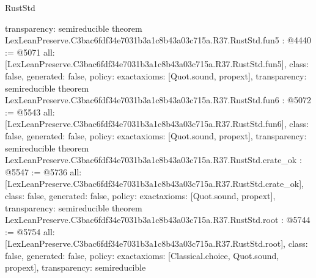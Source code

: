 \begin{lexlean}{RustStd}
\begin{coremodule}
{  transparency: semireducible
}
theorem LexLeanPreserve.C3bac6fdf34e7031b3a1c8b43a03c715a.R37.RustStd.fun5 : @4440 := @5071 {
  all: [LexLeanPreserve.C3bac6fdf34e7031b3a1c8b43a03c715a.R37.RustStd.fun5],
  class: false,
  generated: false,
  policy: exact{axioms: [Quot.sound, propext]},
  transparency: semireducible
}
theorem LexLeanPreserve.C3bac6fdf34e7031b3a1c8b43a03c715a.R37.RustStd.fun6 : @5072 := @5543 {
  all: [LexLeanPreserve.C3bac6fdf34e7031b3a1c8b43a03c715a.R37.RustStd.fun6],
  class: false,
  generated: false,
  policy: exact{axioms: [Quot.sound, propext]},
  transparency: semireducible
}
theorem LexLeanPreserve.C3bac6fdf34e7031b3a1c8b43a03c715a.R37.RustStd.crate_ok : @5547 := @5736 {
  all: [LexLeanPreserve.C3bac6fdf34e7031b3a1c8b43a03c715a.R37.RustStd.crate_ok],
  class: false,
  generated: false,
  policy: exact{axioms: [Quot.sound, propext]},
  transparency: semireducible
}
theorem LexLeanPreserve.C3bac6fdf34e7031b3a1c8b43a03c715a.R37.RustStd.root : @5744 := @5754 {
  all: [LexLeanPreserve.C3bac6fdf34e7031b3a1c8b43a03c715a.R37.RustStd.root],
  class: false,
  generated: false,
  policy: exact{axioms: [Classical.choice, Quot.sound, propext]},
  transparency: semireducible
}


\end{coremodule}
\end{lexlean}
